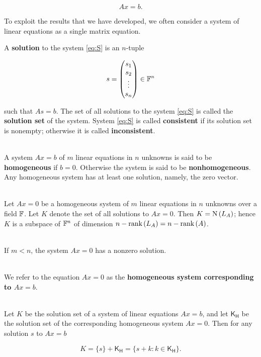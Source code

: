 \begin{definition}
	\[Ax = b.\]
	
	To exploit the results that we have developed, we often consider a system of linear equations as a single matrix equation.
	
	A \textbf{solution} to the system \eqref{eq:S} is an $n$-tuple
	
	\[s = \begin{pmatrix}
		s_1 \\ s_2 \\ \vdots \\ s_n
	\end{pmatrix} \in \mathbb{F}^n\]
	
	such that $As = b$. The set of all solutions to the system \eqref{eq:S} is called the \textbf{solution set} of the system. System \eqref{eq:S} is called \textbf{consistent} if its solution set is nonempty; otherwise it is called \textbf{inconsistent}.
\end{definition}

\begin{definition}
	\hfill\\
	A system $Ax = b$ of $m$ linear equations in $n$ unknowns is said to be \textbf{homogeneous} if $b = 0$. Otherwise the system is said to be \textbf{nonhomogeneous}.\\
	
	Any homogeneous system has at least one solution, namely, the zero vector.
\end{definition}

\begin{theorem}
	\hfill\\
	Let $Ax = 0$ be a homogeneous system of $m$ linear equations in $n$ unknowns over a field $\mathbb{F}$. Let $K$ denote the set of all solutions to $Ax = 0$. Then $K = \text{N}\left(L_A\right)$; hence $K$ is a subspace of $\mathbb{F}^n$ of dimension $n - \text{rank}\left(L_A\right) = n - \text{rank}\left(A\right)$.
\end{theorem}

\begin{corollary}
	\hfill\\
	If $m < n$, the system $Ax = 0$ has a nonzero solution.
\end{corollary}

\begin{definition}
	\hfill\\
	We refer to the equation $Ax = 0$ as the \textbf{homogeneous system corresponding to $Ax = b$}.
\end{definition}

\begin{theorem}
	\hfill\\
	Let $K$ be the solution set of a system of linear equations $Ax = b$, and let $\mathsf{K}_\mathsf{H}$ be the solution set of the corresponding homogeneous system $Ax = 0$. Then for any solution $s$ to $Ax = b$
	
	\[K = \{s\} + \mathsf{K}_\mathsf{H} = \{s + k: k \in \mathsf{K}_\mathsf{H}\}.\]
\end{theorem}

